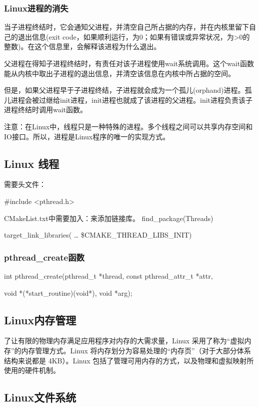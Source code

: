 \documentclass[UTF8]{article}%
\begin{document}
\subsubsection{Linux进程的消失}

当子进程终结时，它会通知父进程，并清空自己所占据的内存，并在内核里留下自己的退出信息(exit code，如果顺利运行，为0；如果有错误或异常状况，为>0的整数)。在这个信息里，会解释该进程为什么退出。

父进程在得知子进程终结时，有责任对该子进程使用wait系统调用。这个wait函数能从内核中取出子进程的退出信息，并清空该信息在内核中所占据的空间。

但是，如果父进程早于子进程终结，子进程就会成为一个孤儿(orphand)进程。孤儿进程会被过继给init进程，init进程也就成了该进程的父进程。init进程负责该子进程终结时调用wait函数。

注意：在Linux中，线程只是一种特殊的进程。多个线程之间可以共享内存空间和IO接口。所以，进程是Linux程序的唯一的实现方式。

\subsection{Linux 线程}

需要头文件：

\#include <pthread.h> 

CMakeList.txt中需要加入：来添加链接库。
find\_package(Threads)

target\_link\_libraries( … \${CMAKE\_THREAD\_LIBS\_INIT})

\subsubsection{pthread\_create函数}

int pthread\_create(pthread\_t *thread, const pthread\_attr\_t *attr,

void *(*start\_routine)(void*), void *arg); 


\subsection{Linux内存管理}

了让有限的物理内存满足应用程序对内存的大需求量，Linux 采用了称为“虚拟内存”的内存管理方式。Linux 将内存划分为容易处理的“内存页”（对于大部分体系结构来说都是 4KB）。Linux 包括了管理可用内存的方式，以及物理和虚拟映射所使用的硬件机制。

\subsection{Linux文件系统}
\end{document}
